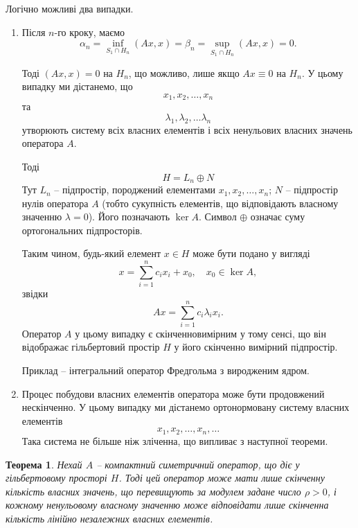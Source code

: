 \documentclass[14pt,twoside]{extreport}
\theoremstyle{mystyle}
\newtheorem{thm}{Теорема}
\numberwithin{equation}{chapter}
\begin{document}
Логічно можливі два випадки.
\begin{enumerate}
 \item Після $n$-го кроку, маємо
\[
 \alpha_n = \inf\limits_{S_1 \cap H_n} (Ax, x) = \beta_n = \sup\limits_{S_1 \cap H_n} (Ax, x) = 0.
\]

Тоді $(Ax, x) = 0$ на $H_n$, що можливо, лише якщо $Ax \equiv 0$ на $H_n$. У цьому випадку ми дістанемо, що
\[
 x_1, x_2, \ldots, x_n
\]
та
\[
 \lambda_1, \lambda_2, \ldots \lambda_n
\]
утворюють систему всіх власних елементів і всіх ненульових власних значень оператора $A$.

Тоді
\[
 H = L_n \oplus N
\]
Тут $L_n$ -- підпростір, породжений елементами $x_1, x_2, \ldots, x_n$; $N$ -- підпростір нулів оператора $A$ (тобто сукупність елементів, що відповідають власному значенню $\lambda = 0$). Його позначають $\ker A$. Символ $\oplus$ означає суму ортогональних підпросторів.

Таким чином, будь-який елемент $x \in H$ може бути подано у вигляді
\[
 x= \sum_{i=1}^{n} c_i x_i + x_0, \quad x_0 \in \ker A,
\]
звідки
\[
 Ax = \sum_{i=1}^{n} c_i \lambda_i x_i.
\]
Оператор $A$ у цьому випадку є скінченновимірним у тому сенсі, що він відображає гільбертовий простір $H$ у його скінченно вимірний підпростір.

Приклад -- інтегральний оператор Фредгольма з виродженим ядром.

\item Процес побудови власних елементів оператора може бути продовжений нескінченно. У цьому випадку ми дістанемо ортонормовану систему власних елементів
\[
 x_1, x_2, \ldots , x_n, \ldots
\]
Така система не більше ніж зліченна, що випливає з наступної теореми.
\end{enumerate}

\begin{thm}
 Нехай $A$ -- компактний симетричний оператор, що діє у гільбертовому просторі $H$. Тоді цей оператор може мати лише скінченну кількість власних значень, що перевищують за модулем задане число $\rho > 0$, і кожному ненульовому власному значенню може відповідати лише скінченна кількість лінійно незалежних власних елементів.
\end{thm}
\end{document}
